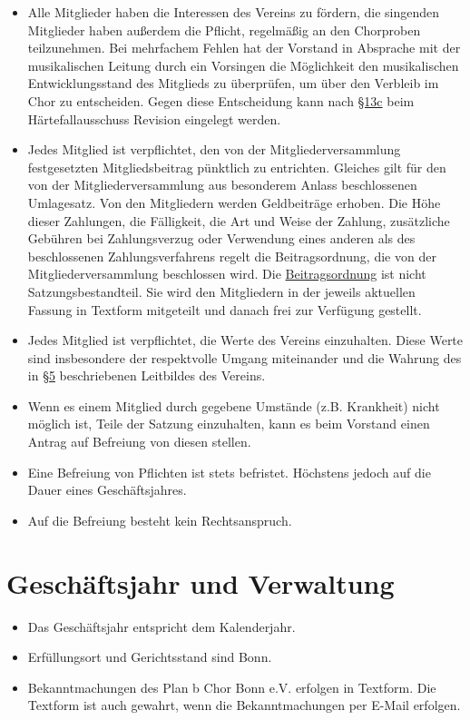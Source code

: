 \documentclass[12pt,paper=a4,ngerman]{report}
\begin{document}
\begin{itemize}
    \item Alle Mitglieder haben die Interessen des Vereins zu fördern, die singenden Mitglieder haben außerdem die Pflicht, regelmäßig an den Chorproben teilzunehmen. Bei mehrfachem Fehlen hat der Vorstand in Absprache mit der musikalischen Leitung durch ein Vorsingen die Möglichkeit den musikalischen Entwicklungsstand des Mitglieds zu überprüfen, um über den Verbleib im Chor zu entscheiden. Gegen diese Entscheidung kann nach \hyperref[par-13]{§13c} beim Härtefallausschuss Revision eingelegt werden.
    \item Jedes Mitglied ist verpflichtet, den von der Mitgliederversammlung festgesetzten Mitgliedsbeitrag pünktlich zu entrichten. Gleiches gilt für den von der Mitgliederversammlung aus besonderem Anlass beschlossenen Umlagesatz. Von den Mitgliedern werden Geldbeiträge erhoben. Die Höhe dieser Zahlungen, die Fälligkeit, die Art und Weise der Zahlung, zusätzliche Gebühren bei Zahlungsverzug oder Verwendung eines anderen als des beschlossenen Zahlungsverfahrens regelt die Beitragsordnung, die von der Mitgliederversammlung beschlossen wird. Die \href{https://plan-b-chor.de/dokumente}{Beitragsordnung} ist nicht Satzungsbestandteil. Sie wird den Mitgliedern in der jeweils aktuellen Fassung in Textform mitgeteilt und danach frei zur Verfügung gestellt.
    \item Jedes Mitglied ist verpflichtet, die Werte des Vereins einzuhalten. Diese Werte sind insbesondere der respektvolle Umgang miteinander und die Wahrung des in \hyperref[par-5]{§5} beschriebenen Leitbildes des Vereins.
    \item Wenn es einem Mitglied durch gegebene Umstände (z.B. Krankheit) nicht möglich ist, Teile der Satzung einzuhalten, kann es beim Vorstand einen Antrag auf Befreiung von diesen stellen.
    \item Eine Befreiung von Pflichten ist stets befristet. Höchstens jedoch auf die Dauer eines Geschäftsjahres.
    \item Auf die Befreiung besteht kein Rechtsanspruch.
\end{itemize}

\section{Geschäftsjahr und Verwaltung}

\begin{itemize}
    \item Das Geschäftsjahr entspricht dem Kalenderjahr.
    \item Erfüllungsort und Gerichtsstand sind Bonn.
    \item Bekanntmachungen des Plan b Chor Bonn e.V. erfolgen in Textform. Die Textform ist auch gewahrt, wenn die Bekanntmachungen per E-Mail erfolgen.
\end{itemize}
\end{document}
